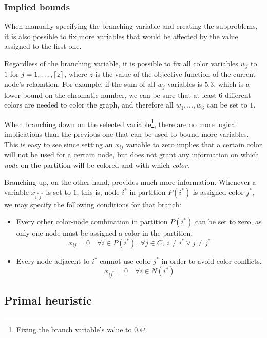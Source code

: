 \subsubsection*{Implied bounds}
\label{subsubsec:alg:branch:bounds}

When manually specifying the branching variable and creating the subproblems, it is also possible to fix more variables that would be affected by the value assigned to the first one.

Regardless of the branching variable, it is possible to fix all color variables $w_j$ to $1$ for $j = 1,\ldots,\left\lceil z \right\rceil$, where $z$ is the value of the objective function of the current node's relaxation. For example, if the sum of all $w_j$ variables is $5.3$, which is a lower bound on the chromatic number, we can be sure that at least $6$ different colors are needed to color the graph, and therefore all $w_1,\ldots,w_6$ can be set to $1$.

When branching down on the selected variable\footnote{Fixing the branch variable's value to 0.}, there are no more logical implications than the previous one that can be used to bound more variables. This is easy to see since setting an $x_{ij}$ variable to zero implies that a certain color will not be used for a certain node, but does not grant any information on which \textit{node} on the partition will be colored and with which \textit{color}.

Branching up, on the other hand, provides much more information. Whenever a variable $x_{i^*j^*}$ is set to $1$, this is, node $i^*$ in partition $P(i^*)$ is assigned color $j^*$, we may specify the following conditions for that branch:

\begin{itemize}
\item Every other color-node combination in partition $P(i^*)$ can be set to zero, as only one node must be assigned a color in the partition.
\[
x_{ij} = 0 \quad \forall i \in P(i^*),\ \forall j \in C,\ i \neq i^* \vee j \neq j^*
\]

\item Every node adjacent to $i^*$ cannot use color $j^*$ in order to avoid color conflicts.
\[
x_{ij^*} = 0 \quad \forall i \in N(i^*)
\]
\end{itemize}

\subsection{Primal heuristic}
\label{subsec:alg:primal}

